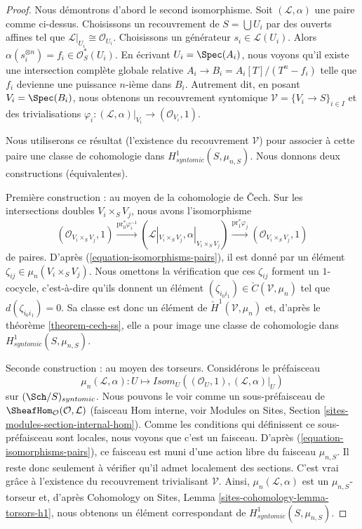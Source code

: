 \begin{proof}
Nous d\'emontrons d'abord le second isomorphisme.
Soit $(\mathcal{L}, \alpha)$ une paire comme ci-dessus.
Choisissons un recouvrement de $S = \bigcup U_i$ par des ouverts affines tel que
$\mathcal{L}|_{U_i} \cong \mathcal{O}_{U_i}$. Choisissons un g\'en\'erateur $s_i \in \mathcal{L}(U_i)$.
Alors $\alpha(s_i^{\otimes n}) = f_i \in \mathcal{O}_S^*(U_i)$.
En \'ecrivant $U_i = \Spec(A_i)$, nous voyons qu'il existe une
intersection compl\`ete globale relative $A_i \to B_i = A_i[T]/(T^n - f_i)$
telle que $f_i$ devienne une puissance $n$-i\`eme dans $B_i$. Autrement dit, en posant
$V_i = \Spec(B_i)$, nous obtenons un recouvrement syntomique
$\mathcal{V} = \{V_i \to S\}_{i \in I}$ et des trivialisations
$\varphi_i : (\mathcal{L}, \alpha)|_{V_i} \to (\mathcal{O}_{V_i}, 1)$.

\medskip\noindent
Nous utiliserons ce r\'esultat (l'existence du recouvrement $\mathcal{V}$)
pour associer \`a cette paire une classe de cohomologie dans
$H^1_{syntomic}(S, \mu_{n, S})$. Nous donnons deux constructions (\'equivalentes).

\medskip\noindent
Premi\`ere construction : au moyen de la cohomologie de {\v C}ech.
Sur les intersections doubles $V_i \times_S V_j$, nous avons l'isomorphisme
$$
(\mathcal{O}_{V_i \times_S V_j}, 1)
\xrightarrow{\text{pr}_0^*\varphi_i^{-1}}
(\mathcal{L}|_{V_i \times_S V_j}, \alpha|_{V_i \times_S V_j})
\xrightarrow{\text{pr}_1^*\varphi_j}
(\mathcal{O}_{V_i \times_S V_j}, 1)
$$
de paires. D'apr\`es (\ref{equation-isomorphisms-pairs}), il est donn\'e par un
\'el\'ement $\zeta_{ij} \in \mu_n(V_i \times_S V_j)$. Nous omettons la v\'erification
que ces $\zeta_{ij}$ forment un $1$-cocycle, c'est-\`a-dire qu'ils donnent
un \'el\'ement $(\zeta_{i_0i_1}) \in \check C(\mathcal{V}, \mu_n)$
tel que $d(\zeta_{i_0i_1}) = 0$. Sa classe est donc un \'el\'ement de
$\check H^1(\mathcal{V}, \mu_n)$ et, d'apr\`es le
th\'eor\`eme \ref{theorem-cech-ss},
elle a pour image une classe de cohomologie dans $H^1_{syntomic}(S, \mu_{n, S})$.

\medskip\noindent
Seconde construction : au moyen des torseurs. Consid\'erons le pr\'efaisceau
$$
\mu_n(\mathcal{L}, \alpha) :
U
\longmapsto
\mathit{Isom}_U((\mathcal{O}_U, 1), (\mathcal{L}, \alpha)|_U)
$$
sur $(\Sch/S)_{syntomic}$.
Nous pouvons le voir comme un sous-pr\'efaisceau de
$\SheafHom_\mathcal{O}(\mathcal{O}, \mathcal{L})$ (faisceau Hom interne,
voir
Modules on Sites, Section \ref{sites-modules-section-internal-hom}).
Comme les conditions qui d\'efinissent ce sous-pr\'efaisceau sont locales, nous voyons que c'est
un faisceau.
D'apr\`es (\ref{equation-isomorphisms-pairs}), ce faisceau est muni d'une action libre du
faisceau $\mu_{n, S}$. Il reste donc seulement \`a v\'erifier qu'il
admet localement des sections. C'est vrai gr\^ace \`a l'existence du
recouvrement trivialisant $\mathcal{V}$. Ainsi, $\mu_n(\mathcal{L}, \alpha)$
est un $\mu_{n, S}$-torseur et, d'apr\`es
Cohomology on Sites, Lemma \ref{sites-cohomology-lemma-torsors-h1},
nous obtenons un \'el\'ement correspondant de $H^1_{syntomic}(S, \mu_{n, S})$.


\end{proof}
